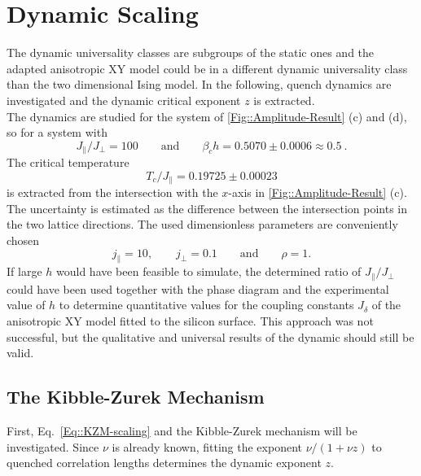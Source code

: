 	\section{Dynamic Scaling}	
	The dynamic universality classes are subgroups of the static ones \cite{hohenberg1977theory} and the adapted anisotropic XY model could be in a different dynamic universality class than the two dimensional Ising model. In the following, quench dynamics are investigated and the dynamic critical exponent $z$ is extracted. \\
	
	The dynamics are studied for the system of \def\figureautorefname{Figs.}\autoref{Fig::Amplitude-Result}\def\figureautorefname{Fig.} (c) and (d), so for a system with 
	\begin{equation}
		J_\parallel /	J_\perp = 100 \qquad \text{and} \qquad \beta_c h =	0.5070 \pm 0.0006 \approx 0.5 ~.
	\end{equation}
	The critical temperature
		\begin{equation}
		T_c /	J_\parallel = 0.19725 \pm 0.00023
	\end{equation}
	is extracted from the intersection with the $x$-axis in \autoref{Fig::Amplitude-Result} (c). The uncertainty is estimated as the difference between the intersection points in the two lattice directions. 
	The used dimensionless parameters are conveniently chosen
	\begin{equation} \label{Eq::10-1-couplings}
		j_\parallel =	10, \qquad j_\perp = 0.1 \qquad \text{and} \qquad \rho =	1.
	\end{equation}
	If large $h$ would have been feasible to simulate, the determined ratio of $J_\parallel / J_\perp $ could have been used together with the phase diagram and the experimental value of $h$ to determine quantitative values for the coupling constants $J_\delta$ of the anisotropic XY model fitted to the silicon surface. This approach was not successful, but the qualitative and universal results of the dynamic should still be valid. 
	\subsection{The Kibble-Zurek Mechanism}
	First, Eq.~\eqref{Eq::KZM-scaling} and the Kibble-Zurek mechanism will be investigated. Since $\nu$ is already known, fitting the exponent $\nu /	(1 + \nu z)$ to quenched correlation lengths determines the dynamic exponent $z$. \\
	
